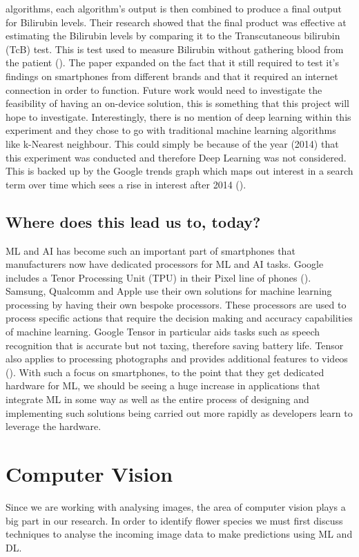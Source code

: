 \documentclass{article}
\begin{document}
algorithms, each algorithm’s output is then combined to produce a final output for Bilirubin levels. Their research 
showed that the final product was effective at estimating the Bilirubin levels by comparing it to the Transcutaneous 
bilirubin (TcB) test. This is test used to measure Bilirubin without gathering blood from the patient 
(\cite{tufts2021}). The paper expanded on the fact that it still required to test it’s findings on smartphones 
from different brands and that it required an internet connection in order to function. Future work would need to 
investigate the feasibility of having an on-device solution, this is something that this project will hope to 
investigate. Interestingly, there is no mention of deep learning within this experiment and they chose to go with 
traditional machine learning algorithms like k-Nearest neighbour. This could simply be because of the year (2014) 
that this experiment was conducted and therefore Deep Learning was not considered. This is backed up by the Google 
trends graph which maps out interest in a search term over time which sees a rise in interest after 2014 (\cite{googletrends}).
\subsection{Where does this lead us to, today?} 
ML and AI has become such an important part of smartphones that manufacturers now have dedicated processors for ML and 
AI tasks. Google includes a Tenor Processing Unit (TPU) in their Pixel line of phones (\cite{triggs2021}). Samsung, 
Qualcomm and Apple use their own solutions for machine learning processing by having their own bespoke processors. These
 processors are used to process specific actions that require the decision making and accuracy capabilities of machine 
 learning. Google Tensor in particular aids tasks such as speech recognition that is accurate but not taxing, therefore 
 saving battery life. Tensor also applies to processing photographs and provides additional features to videos 
 (\cite{gupta2021}). With such a focus on smartphones, to the point that they get dedicated hardware for ML, we should be 
 seeing a huge increase in applications that integrate ML in some way as well as the entire process of designing and 
 implementing such solutions being carried out more rapidly as developers learn to leverage the hardware.
\section{Computer Vision}
Since we are working with analysing images, the area of computer vision plays a big part in our research. In order to 
identify flower species we must first discuss techniques to analyse the incoming image data to make predictions using
 ML and DL.
\end{document}
